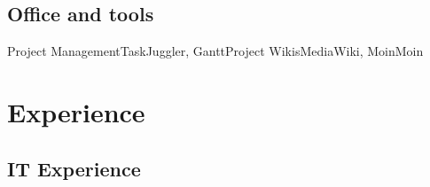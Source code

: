 \documentclass[11pt,a4paper,nolmodern]{moderncv}
\begin{document}
\subsection{Office and tools}
           {Project Management}{TaskJuggler, GanttProject}
           {Wikis}{MediaWiki, MoinMoin}


\newpage

\section{Experience}
\subsection{IT Experience}

\end{document}
